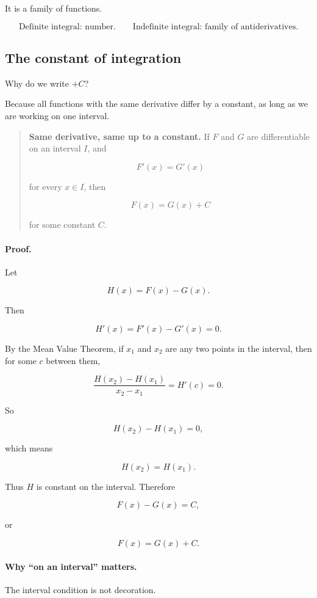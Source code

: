 It is a family of functions.

\[
\boxed{
\text{Definite integral: number.}
\qquad
\text{Indefinite integral: family of antiderivatives.}
}
\]

\subsection{The constant of integration}
\label{subsec:constant-of-integration}

Why do we write \(+C\)?

Because all functions with the same derivative differ by a constant, as long as we are
working on one interval.

\begin{quote}
\textbf{Same derivative, same up to a constant.}
If \(F\) and \(G\) are differentiable on an interval \(I\), and

\[
F'(x)=G'(x)
\]

for every \(x\in I\), then

\[
F(x)=G(x)+C
\]

for some constant \(C\).
\end{quote}

\paragraph{Proof.}
Let

\[
H(x)=F(x)-G(x).
\]

Then

\[
H'(x)=F'(x)-G'(x)=0.
\]

By the Mean Value Theorem, if \(x_1\) and \(x_2\) are any two points in the interval,
then for some \(c\) between them,

\[
\frac{H(x_2)-H(x_1)}{x_2-x_1}=H'(c)=0.
\]

So

\[
H(x_2)-H(x_1)=0,
\]

which means

\[
H(x_2)=H(x_1).
\]

Thus \(H\) is constant on the interval.  Therefore

\[
F(x)-G(x)=C,
\]

or

\[
F(x)=G(x)+C.
\]

\paragraph{Why ``on an interval'' matters.}
The interval condition is not decoration.

